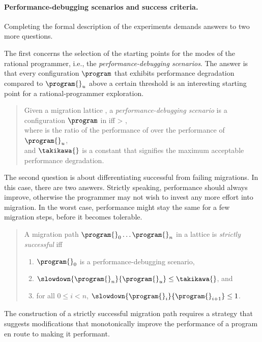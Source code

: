 \paragraph{Performance-debugging scenarios and success criteria.} Completing the
formal description of the experiments demands answers to two more questions.

The first concerns the selection of the starting points for the modes of the
rational programmer, i.e., the \emph{performance-debugging scenarios}.  The
answer is that every configuration $\program$ that exhibits performance
degradation compared to $\program{}_u$ above a certain threshold is an
interesting starting point for a rational-programmer exploration.

\begin{quote} \em

Given a migration lattice ,
a \emph{performance-debugging scenario} is a configuration $\program$ in  
iff
 > \takikawa{},\\
 where  is the ratio of the performance of \program{} over the performance of $\program{}_u$,\\ 
 and $\takikawa{}$ is a constant that signifies the maximum acceptable performance degradation.
\end{quote}

The second question is about differentiating successful from failing migrations.
In this case, there are two answers. Strictly speaking, performance should
always improve, otherwise the programmer may not wish to invest any more effort
into migration.  In the worst case, performance might stay the same for a few
migration steps, before it becomes tolerable.

\begin{quote} \em

A migration path ${\program{}_0} \ldots {\program{}_n}$ in a lattice 
is \emph{strictly successful}
iff
\begin{enumerate}
  \item $\program{}_0$ is a performance-debugging scenario,
  \item $\slowdown{\program{}_n}{\program{}_u} \leq \takikawa{}$, and 
  \item for all $0 \leq i < n$, $\slowdown{\program{}_i}{\program{}_{i+1}} \leq 1$.
 \end{enumerate} 
\end{quote}
The construction of a strictly successful migration path requires a strategy
that suggests modifications that monotonically improve the performance of  a
program en route to making it performant.

